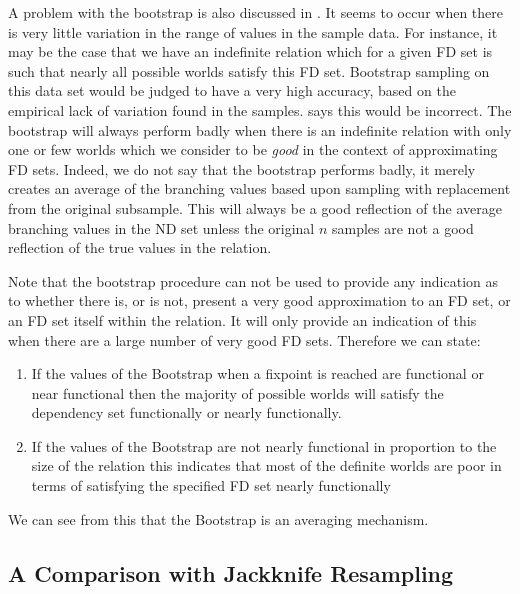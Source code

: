 A problem with the bootstrap is also discussed in \cite{de83}. It
seems to occur when there is very little variation in the range
of values in the sample data. For instance, it may be the case that
we have an indefinite relation which for a given FD set is such that
nearly all possible worlds satisfy this FD set. Bootstrap sampling
on this data set would be judged to have a very high accuracy,
based on the empirical lack of variation found in the samples.
\cite{de83} says this would be incorrect. The bootstrap will always
perform badly when there is an indefinite relation
with only one or few worlds which we consider to be {\em good} in
the context of approximating FD sets.
Indeed, we do not say that the bootstrap performs badly, it merely
creates an average of the branching values based upon sampling with
replacement from the original subsample. This will always be a good
reflection of the average branching values in the ND set unless the
original $n$ samples are not a good reflection of the true values
in the relation.

Note that the bootstrap procedure can not be used to provide any
indication as to whether there is, or is not, present a very good
approximation to an FD set, or an FD set itself within the relation.
It will only provide an indication of this when there are a large 
number of very good FD sets. Therefore we can state:
\begin{enumerate}
\item If the values of the Bootstrap when a fixpoint is reached
are functional or near functional then the majority of possible
worlds will satisfy the dependency set functionally or nearly functionally.
\item If the values of the Bootstrap are not
nearly functional in proportion to the size of the relation this
indicates that most of the definite worlds are poor in terms of
satisfying the specified FD set nearly functionally
\end{enumerate} 

We can see from this that the Bootstrap is an averaging mechanism.

\subsection{A Comparison with Jackknife Resampling}


